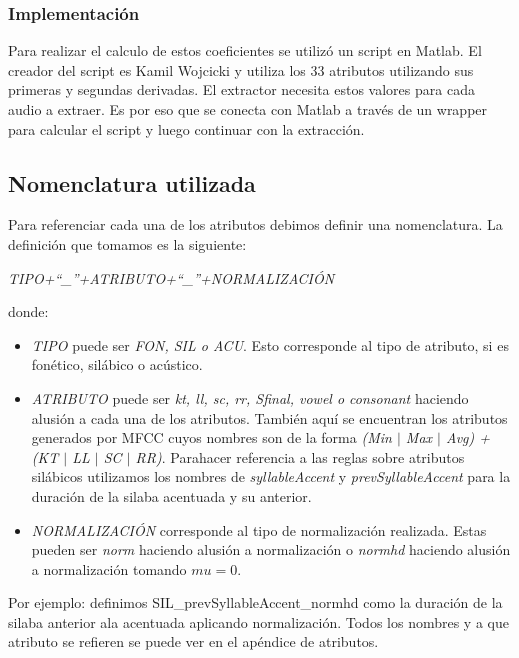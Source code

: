 \subsubsection{Implementación}

Para realizar el calculo de estos coeficientes se utilizó un script en Matlab. El creador del script es Kamil Wojcicki y utiliza los 33 atributos utilizando sus primeras y segundas derivadas. El extractor necesita estos valores para cada audio a extraer. Es por eso que se conecta con Matlab a través de un wrapper para calcular el script y luego continuar con la extracción.

\subsection{Nomenclatura utilizada}
Para referenciar cada una de los atributos debimos definir una nomenclatura. La definición que tomamos es la siguiente:
\begin{center}
\textit{TIPO+``\_''+ATRIBUTO+``\_''+NORMALIZACIÓN} 
\end{center}
donde:
\begin{itemize}
  \item \emph{TIPO} puede ser \emph{FON, SIL o ACU}. Esto corresponde al tipo de atributo, si es fonético, silábico o acústico.
  \item \emph{ATRIBUTO} puede ser \emph{kt, ll, sc, rr, Sfinal, vowel o consonant} haciendo alusión a cada una de los atributos. También aquí se encuentran los atributos generados por MFCC cuyos nombres son de la forma \emph{(Min $|$ Max $|$ Avg) + (KT $|$ LL $|$ SC $|$ RR)}. Parahacer referencia a las reglas sobre atributos silábicos utilizamos los nombres de \emph{syllableAccent} y \emph{prevSyllableAccent} para la duración de la silaba acentuada y su anterior.
  \item \emph{NORMALIZACIÓN} corresponde al tipo de normalización realizada. Estas pueden ser \emph{norm} haciendo alusión a normalización o \emph{normhd} haciendo alusión a normalización tomando $mu=0$.
\end{itemize}
 
Por ejemplo: definimos  SIL\_prevSyllableAccent\_normhd como la duración de la silaba anterior ala acentuada aplicando normalización. Todos los nombres y a que atributo se refieren se puede ver en el apéndice de atributos.
